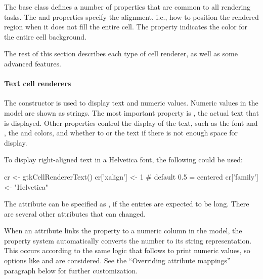 
The base class  defines a number of properties
that are common to all rendering tasks. The  and
 properties specify the alignment, i.e., how to position
the rendered region when it does not fill the entire cell. The
 property indicates the color for the entire
cell background.

The rest of this section describes each type of cell renderer, as well
as some advanced features.

\paragraph{Text cell renderers}

The  constructor is used to display
text and numeric values. Numeric values in the model are shown as
strings.  The most important property is , the actual text
that is displayed. Other properties control the display of the text,
such as the font  and , the 
and  colors, and whether to  or
 the text if there is not enough space for display.

To display right-aligned text in a Helvetica font, the following could be used:
\begin{Schunk}
\begin{Sinput}
 cr <- gtkCellRendererText()
 cr['xalign'] <- 1                       # default 0.5 = centered
 cr['family'] <- "Helvetica"  
\end{Sinput}
\end{Schunk}

The  attribute can be specified as , if the
entries are expected to be long. There are several other attributes that can
changed. 

When an attribute links the  property to a numeric column
in the model, the property system automatically converts the number to
its string representation. This occurs according to the same logic
that \R\/ follows to print numeric values, so options like
 and  are considered. See the ``Overriding
attribute mappings'' paragraph below for further customization.


